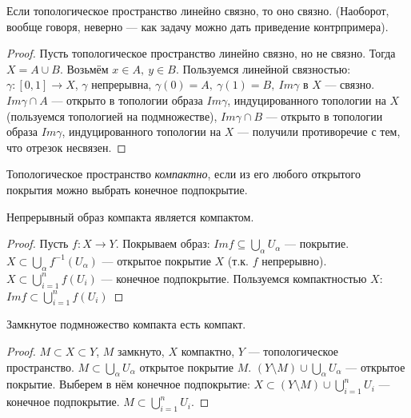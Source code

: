 \begin{statement}
    Если топологическое пространство линейно связно, то оно связно. (Наоборот, вообще говоря, неверно — как задачу можно дать приведение контрпримера).
\end{statement}
\begin{proof}
    Пусть топологическое пространство линейно связно, но не связно. Тогда $X = A \cup B$. Возьмём $x \in A, \ y \in B$. Пользуемся линейной связностью: $\gamma: [0, 1] \to X$, $\gamma$ непрерывна, $\gamma(0) = A, \ \gamma(1) = B, \ Im \gamma$ в $X$ — связно.
    $Im \gamma \cap A$ — открыто в топологии образа $Im \gamma$, индуцированного топологии на $X$ (пользуемся топологией на подмножестве), $Im \gamma \cap B$ — открыто в топологии образа $Im \gamma$, индуцированного топологии на $X$ — получили противоречие с тем, что отрезок несвязен.
\end{proof}

\begin{definition}
    Топологическое пространство \textit{компактно}, если из его любого открытого покрытия можно выбрать конечное подпокрытие.
\end{definition}

\begin{statement}
    Непрерывный образ компакта является компактом.
\end{statement}
\begin{proof}
    Пусть $f: X \to Y$. Покрываем образ: $Im f \subseteq \bigcup_{\alpha} U_{\alpha}$ — покрытие.
    $X \subset \bigcup_{\alpha} f^{-1}(U_{\alpha})$ — открытое покрытие $X$ (т.к. $f$ непрерывно).
    $X \subset \bigcup_{i = 1}^{n} f(U_{i})$ — конечное подпокрытие.
    Пользуемся компактностью $X$: $Im f \subset \bigcup_{i = 1}^{n} f(U_{i})$
\end{proof}

\begin{statement}
    Замкнутое подмножество компакта есть компакт.
\end{statement}
\begin{proof}
    $M \subset X \subset Y$, $M$ замкнуто, $X$ компактно, $Y$ — топологическое пространство.
    $M \subset \bigcup_{\alpha} U_{\alpha}$ открытое покрытие $M$.
    $(Y \setminus M) \cup \bigcup_{\alpha} U_{\alpha}$ — открытое покрытие.
    Выберем в нём конечное подпокрытие:
    $X \subset (Y \setminus M) \cup \bigcup_{i = 1}^n U_i$ — конечное подпокрытие.
    $M \subset \bigcup_{i = 1}^n U_i$.
\end{proof}

